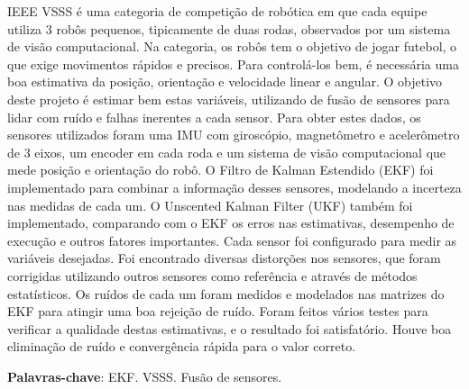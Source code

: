 \documentclass[
	12pt,				%
	openright,			%
	twoside,			%
	convert,
	a4paper,			%
	english,			%
	french,				%
	spanish,			%
	brazil				%
	]{abntex2}
\begin{document}

%
% 
%
\begin{folhadeaprovacao}
  
\end{folhadeaprovacao}


\setlength{\absparsep}{18pt} %
\begin{resumo}
\par
IEEE VSSS é uma categoria de competição de robótica em que cada equipe utiliza 3 robôs pequenos, tipicamente de duas rodas, observados por um sistema de visão computacional. Na categoria, os robôs tem o objetivo de jogar futebol, o que exige movimentos rápidos e precisos. Para controlá-los bem, é necessária uma boa estimativa da posição, orientação e velocidade linear e angular. O objetivo deste projeto é estimar bem estas variáveis, utilizando de fusão de sensores para lidar com ruído e falhas inerentes a cada sensor.
\newline
Para obter estes dados, os sensores utilizados foram uma IMU com giroscópio, magnetômetro e acelerômetro de 3 eixos, um encoder em cada roda e um sistema de visão computacional que mede posição e orientação do robô. O Filtro de Kalman Estendido (EKF) foi implementado para combinar a informação desses sensores, modelando a incerteza nas medidas de cada um.
\newline
O Unscented Kalman Filter (UKF) também foi implementado, comparando com o EKF os erros nas estimativas, desempenho de execução e outros fatores importantes.
\newline
Cada sensor foi configurado para medir as variáveis desejadas. Foi encontrado diversas distorções nos sensores, que foram corrigidas utilizando outros sensores como referência e através de métodos estatísticos. Os ruídos de cada um foram medidos e modelados nas matrizes do EKF para atingir uma boa rejeição de ruído.
\newline
Foram feitos vários testes para verificar a qualidade destas estimativas, e o resultado foi satisfatório. Houve boa eliminação de ruído e convergência rápida para o valor correto.

 \textbf{Palavras-chave}: EKF. VSSS. Fusão de sensores.
\end{resumo}
\end{document}
